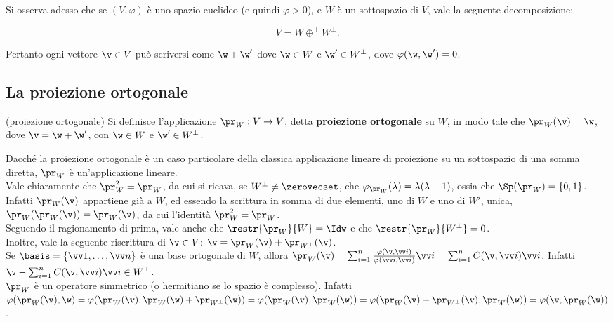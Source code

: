 \begin{remark}
	Si osserva adesso che se $(V, \varphi)$ è uno spazio euclideo (e quindi $\varphi > 0$), e $W$ è
	un sottospazio di $V$, vale la seguente decomposizione:
	
	\[ V = W \oplus^\perp W^\perp. \]
	
	Pertanto ogni vettore $\v \in V$ può scriversi come $\w + \w'$ dove $\w \in W$ e $\w' \in W^\perp$,
	dove $\varphi(\w, \w') = 0$.
\end{remark}

\subsection{La proiezione ortogonale}

\begin{definition} (proiezione ortogonale)
	Si definisce l'applicazione $\pr_W : V \to V$, detta \textbf{proiezione ortogonale} su $W$,
	in modo tale che $\pr_W(\v) = \w$, dove $\v = \w + \w'$, con $\w \in W$ e $\w' \in W^\perp$.
\end{definition}

\begin{remark}\nl
	\li Dacché la proiezione ortogonale è un caso particolare della classica applicazione lineare
	di proiezione su un sottospazio di una somma diretta, $\pr_W$ è un'applicazione lineare. \\
	\li Vale chiaramente che $\pr_W^2 = \pr_W$, da cui si ricava, se $W^\perp \neq \zerovecset$, che
	$\varphi_{\pr_W}(\lambda) = \lambda (\lambda -1)$, ossia che $\Sp(\pr_W) = \{0, 1\}$. Infatti
	$\pr_W(\v)$ appartiene già a $W$, ed essendo la scrittura in somma di due elementi, uno di $W$ e
	uno di $W'$, unica, $\pr_W(\pr_W(\v)) = \pr_W(\v)$, da cui l'identità $\pr_W^2 = \pr_W$. \\
	\li Seguendo il ragionamento di prima, vale anche che $\restr{\pr_W}{W} = \Idw$ e che
	$\restr{\pr_W}{W^\perp} = 0$. \\
	\li Inoltre, vale la seguente riscrittura di $\v \in V$: $\v = \pr_W(\v) + \pr_{W^\perp}(\v)$. \\
	\li Se $\basis = \{ \vv1, \ldots, \vv n \}$ è una base ortogonale di $W$, allora
	$\pr_W(\v) = \sum_{i=1}^n \frac{\varphi(\v, \vv i)}{\varphi(\vv i, \vv i)} \vv i = \sum_{i=1}^n C(\v, \vv i) \vv i$. Infatti $\v -\sum_{i=1}^n C(\v, \vv i) \vv i \in W^\perp$. \\
	\li $\pr_W$ è un operatore simmetrico (o hermitiano se lo spazio è complesso). Infatti $\varphi(\pr_W(\v), \w) =
	\varphi(\pr_W(\v), \pr_W(\w) + \pr_{W^\perp}(\w)) = \varphi(\pr_W(\v), \pr_W(\w)) = \varphi(\pr_W(\v) + \pr_{W^\perp}(\v), \pr_W(\w)) = \varphi(\v, \pr_W(\w))$.
\end{remark}

